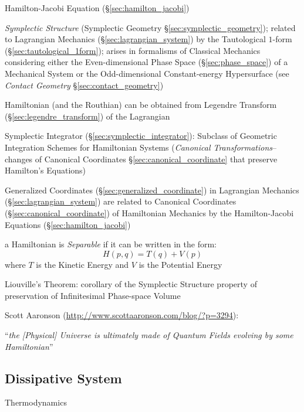 \fist Hamilton-Jacobi Equation (\S\ref{sec:hamilton_jacobi})

\emph{Symplectic Structure} (Symplectic Geometry
\S\ref{sec:symplectic_geometry}); related to Lagrangian Mechanics
(\S\ref{sec:lagrangian_system}) by the Tautological $1$-form
(\S\ref{sec:tautological_1form}); arises in formalisms of Classical Mechanics
considering either the Even-dimensional Phase Space (\S\ref{sec:phase_space})
of a Mechanical System or the Odd-dimensional Constant-energy Hypersurface (see
\emph{Contact Geometry} \S\ref{sec:contact_geometry})

Hamiltonian (and the Routhian) can be obtained from Legendre Transform
(\S\ref{sec:legendre_transform}) of the Lagrangian

\fist Symplectic Integrator (\S\ref{sec:symplectic_integrator}): Subclass of
Geometric Integration Schemes for Hamiltonian Systems (\emph{Canonical
  Transformations}-- changes of Canonical Coordinates
\S\ref{sec:canonical_coordinate} that preserve Hamilton's Equations)

Generalized Coordinates (\S\ref{sec:generalized_coordinate}) in Lagrangian
Mechanics (\S\ref{sec:lagrangian_system}) are related to Canonical Coordinates
(\S\ref{sec:canonical_coordinate}) of Hamiltonian Mechanics by the
Hamilton-Jacobi Equations (\S\ref{sec:hamilton_jacobi})

a Hamiltonian is \emph{Separable} if it can be written in the form:
\[
  H(p,q) = T(q) + V(p)
\]
where $T$ is the Kinetic Energy and $V$ is the Potential Energy

Liouville's Theorem: corollary of the Symplectic Structure property of
preservation of Infinitesimal Phase-space Volume

Scott Aaronson (\url{http://www.scottaaronson.com/blog/?p=3294}):

``\emph{the [Physical] Universe is ultimately made of Quantum Fields
  evolving by some Hamiltonian}''



\subsection{Dissipative System}\label{sec:dissipative_system}

Thermodynamics



